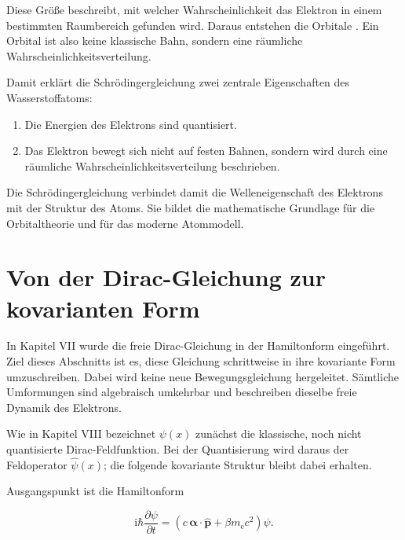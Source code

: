 Diese Größe beschreibt, mit welcher Wahrscheinlichkeit das Elektron in einem
bestimmten Raumbereich gefunden wird. Daraus entstehen die Orbitale
. Ein Orbital ist also keine klassische Bahn,
sondern eine räumliche Wahrscheinlichkeitsverteilung.

Damit erklärt die Schrödingergleichung zwei zentrale Eigenschaften des
Wasserstoffatoms:

\begin{enumerate}
	\item Die Energien des Elektrons sind quantisiert.
	\item Das Elektron bewegt sich nicht auf festen Bahnen, sondern wird durch
	eine räumliche Wahrscheinlichkeitsverteilung beschrieben.
\end{enumerate}

Die Schrödingergleichung verbindet damit die Welleneigenschaft des Elektrons
mit der Struktur des Atoms. Sie bildet die mathematische Grundlage für die
Orbitaltheorie und für das moderne Atommodell.






\section{Von der Dirac-Gleichung zur kovarianten Form}
\label{app:diracgleichung_kovariante_form}

In Kapitel VII wurde die freie Dirac-Gleichung in der Hamiltonform
eingeführt. Ziel dieses Abschnitts ist es, diese Gleichung schrittweise
in ihre kovariante Form umzuschreiben. Dabei wird keine neue
Bewegungsgleichung hergeleitet. Sämtliche Umformungen sind algebraisch
umkehrbar und beschreiben dieselbe freie Dynamik des Elektrons.

Wie in Kapitel VIII bezeichnet \(\psi(x)\) zunächst die klassische, noch
nicht quantisierte Dirac-Feldfunktion. Bei der Quantisierung wird daraus
der Feldoperator \(\hat{\psi}(x)\); die folgende kovariante Struktur bleibt
dabei erhalten.

Ausgangspunkt ist die Hamiltonform

\begin{equation}
	\mathrm{i}\hbar
	\frac{\partial\psi}{\partial t}
	=
	\left(
	c\,\boldsymbol{\alpha}\cdot\hat{\mathbf p}
	+
	\beta m_{\mathrm e}c^2
	\right)
	\psi.
	\label{eq:app_dirac_hamiltonform_ausgangspunkt}
\end{equation}

